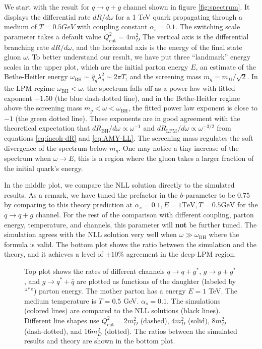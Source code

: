 We start with the result for $q\rightarrow q+g$ channel shown in 
figure \ref{fig:spectrum}.
It displays the differential rate $dR/d\omega$ for a 1 TeV quark propagating through a medium of $T=0.5 GeV$ with coupling constant $\alpha_s = 0.1$.
The switching scale parameter takes a default value $Q_{\textrm{cut}}^2 = 4 m_D^2$
The vertical axis is the differential branching rate $dR/d\omega$, and the horizontal axis is the energy of the final state gluon $\omega$.
To better understand our result, we have put three ``landmark'' energy scales in the upper plot, which are the initial parton energy $E$, an estimate of the Bethe-Heitler energy $\omega_{\textrm{BH}}\sim\hat{q}_g \lambda_g^2 \sim 2\pi T$, and the screening mass $m_g = m_D/\sqrt{2}$.
In the LPM regime $\omega_{\textrm{BH}} < \omega$, the spectrum falls off as a power law with fitted exponent $-1.50$ (the blue dash-dotted line), and in the Bethe-Heitler regime above the screening mass $m_g < \omega < \omega_{\textrm{BH}}$, the fitted power law exponent is close to $-1$ (the green dotted line).
These exponents are in good agreement with the theoretical expectation that $dR_{\textrm{BH}}/d\omega \propto \omega^{-1}$ and $dR_{\textrm{LPM}}/d\omega \propto \omega^{-3/2}$ from equations \ref{eq:incoh-dR} and \ref{eq:AMY-LL}.
The screening mass regulates the soft divergence of the spectrum below $m_g$.
One may notice a tiny increase of the spectrum when $\omega \rightarrow E$, this is a region where the gluon takes a larger fraction of the initial quark's energy.

In the middle plot, we compare the NLL solution directly to the simulated results.
As a remark, we have tuned the prefactor in the $b$-parameter to be $0.75$  by comparing to this theory prediction at $\alpha_s=0.1, E=1 \textrm{TeV}, T = 0.5 \textrm{GeV}$ for the $q\rightarrow q+g$ channel.
For the rest of the comparison with different coupling, parton energy, temperature, and channels, this parameter will {\bf not} be further tuned.
The simulation agrees with the NLL solution very well when $\omega \gg \omega_{\textrm{BH}}$ where the formula is valid.
The bottom plot shows the ratio between the simulation and the theory, and it achieves a level of $\pm 10\%$ agreement in the deep-LPM region.

\begin{figure}
\singlespacing
{}
\caption[Top plot shows the rates of different channels $q\rightarrow q+g^*$,]{Top plot shows the rates of different channels $q\rightarrow q+g^*$, $g\rightarrow g+g^*$, and $g\rightarrow q^* + \bar{q}$ are plotted as functions of the daughter (labeled by ``${}^*$'') parton energy. The mother parton has a energy $E=1$ TeV. The medium temperature is $T=0.5$ GeV. $\alpha_s = 0.1$. The simulations (colored lines) are compared to the NLL solutions (black lines). Different line shapes use $Q_{\textrm{cut}}^2 = 2m_D^2$ (dashed), $4m_D^2$ (solid), $8m_D^2$ (dash-dotted), and $16 m_D^2$ (dotted).
The ratios between the simulated results and theory are shown in the bottom plot.}
\label{fig:channel_rate}
\end{figure}

